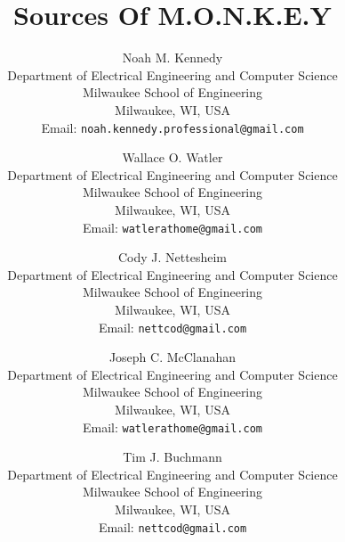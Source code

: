 \documentclass[8pt]{article}
\title{
    Sources Of M.O.N.K.E.Y
}
\author{
    Noah M. Kennedy \\[3pt]
    {\small Department of Electrical Engineering and Computer Science} \\
    {\small Milwaukee School of Engineering} \\
    {\small Milwaukee, WI, USA} \\
    {\small Email: {\texttt{noah.kennedy.professional@gmail.com} }} \\
    \and
    Wallace O. Watler \\[3pt]
    {\small Department of Electrical Engineering and Computer Science} \\
    {\small Milwaukee School of Engineering} \\
    {\small Milwaukee, WI, USA} \\
    {\small Email: {\texttt{watlerathome@gmail.com} }} \\
    \and
    Cody J. Nettesheim \\[3pt]
    {\small Department of Electrical Engineering and Computer Science} \\
    {\small Milwaukee School of Engineering} \\
    {\small Milwaukee, WI, USA} \\
    {\small Email: {\texttt{nettcod@gmail.com} }} \\
    \and
    Joseph C. McClanahan \\[3pt]
    {\small Department of Electrical Engineering and Computer Science} \\
    {\small Milwaukee School of Engineering} \\
    {\small Milwaukee, WI, USA} \\
    {\small Email: {\texttt{watlerathome@gmail.com} }} \\
    \and
    Tim J. Buchmann \\[3pt]
    {\small Department of Electrical Engineering and Computer Science} \\
    {\small Milwaukee School of Engineering} \\
    {\small Milwaukee, WI, USA} \\
    {\small Email: {\texttt{nettcod@gmail.com} }}
}
\begin{document}
    \maketitle~\nocite{*}
    \newpage

    \printbibliography
\end{document}

